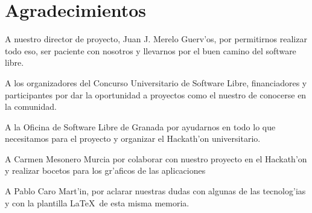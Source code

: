 \section{Agradecimientos}
\label{sec:agradecimientos}

A nuestro director de proyecto, Juan J. Merelo Guerv'os, por permitirnos realizar todo eso, ser paciente con nosotros y llevarnos por el buen camino del software libre.

A los organizadores del Concurso Universitario de Software Libre, financiadores y participantes por dar la oportunidad a proyectos como el nuestro
de conocerse en la comunidad.

A la Oficina de Software Libre de Granada por ayudarnos en todo lo que necesitamos para el proyecto y organizar el Hackath'on universitario.

A Carmen Mesonero Murcia por colaborar con nuestro proyecto en el Hackath'on y realizar bocetos para los gr'aficos de las aplicaciones

A Pablo Caro Mart'in, por aclarar nuestras dudas con algunas de las tecnolog'ias y con la plantilla \LaTeX\ de esta misma memoria.